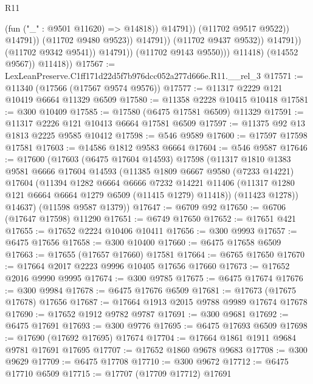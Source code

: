 \begin{lexlean}{R11}
\begin{coremodule}
                                              (fun ("_" : @9501 @11620) => @14818))
                                            @14791))
                                        (@11702 @9517 @9522))
                                      @14791))
                                  (@11702 @9480 @9523))
                                @14791))
                            (@11702 @9437 @9532))
                          @14791))
                      (@11702 @9342 @9541))
                    @14791))
                (@11702 @9143 @9550)))
            @11418)
          (@14552 @9567))
        @11418))
@17567 := LexLeanPreserve.C1ff171d22d5f7b976dcc052a277d666e.R11.__rel_3
@17571 := @11340 (@17566 (@17567 @9574 @9576))
@17577 := @11317 @2229 @121 @10419 @6664 @11329 @6509
@17580 := @11358 @2228 @10415 @10418
@17581 := @300 @10409
@17585 := @17580 (@6475 @17581 @6509) @11329
@17591 := @11317 @2226 @121 @10413 @6664 @17581 @6509
@17597 := @11375 @92 @13 @1813 @2225 @9585 @10412
@17598 := @546 @9589
@17600 := @17597 @17598 @17581
@17603 := @14586 @1812 @9583 @6664
@17604 := @546 @9587
@17646 := @17600
    (@17603
      (@6475 @17604 @14593)
      @17598
      (@11317
        @1810
        @1383
        @9581
        @6666
        @17604
        @14593
        (@11385
          @1809
          @6667
          @9580
          (@7233 @14221)
          @17604
          (@11394
            @1282
            @6664
            @6666
            @7232
            @14221
            @11406
            (@11317 @1280 @121 @6664 @6664 @1279 @6509 (@11415 @1279) @11418))
          (@11423 @1278))
        @14637)
      (@11598 @9587 @1379))
@17647 := @6709 @92
@17650 := @6706 (@17647 @17598) @11290
@17651 := @6749 @17650
@17652 := @17651 @421
@17655 := @17652 @2224 @10406 @10411
@17656 := @300 @9993
@17657 := @6475 @17656
@17658 := @300 @10400
@17660 := @6475 @17658 @6509
@17663 := @17655 (@17657 @17660) @17581
@17664 := @6765 @17650
@17670 := @17664 @2017 @2223 @9996 @10405 @17656 @17660
@17673 := @17652 @2016 @9990 @9995
@17674 := @300 @9785
@17675 := @6475 @17674
@17676 := @300 @9984
@17678 := @6475 @17676 @6509
@17681 := @17673 (@17675 @17678) @17656
@17687 := @17664 @1913 @2015 @9788 @9989 @17674 @17678
@17690 := @17652 @1912 @9782 @9787
@17691 := @300 @9681
@17692 := @6475 @17691
@17693 := @300 @9776
@17695 := @6475 @17693 @6509
@17698 := @17690 (@17692 @17695) @17674
@17704 := @17664 @1861 @1911 @9684 @9781 @17691 @17695
@17707 := @17652 @1860 @9678 @9683
@17708 := @300 @9629
@17709 := @6475 @17708
@17710 := @300 @9672
@17712 := @6475 @17710 @6509
@17715 := @17707 (@17709 @17712) @17691

\end{coremodule}
\end{lexlean}
